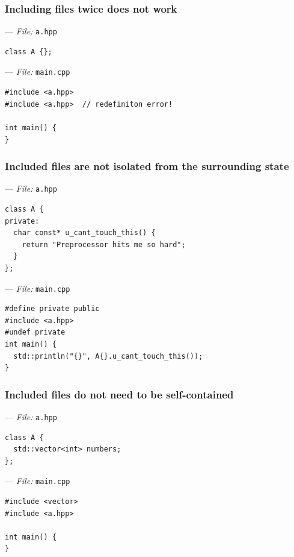 \documentclass[aspectratio=169]{beamer}
\newif\iftransitions
\newcommand{\cpause}{\iftransitions \pause \fi}
\begin{document}
\begin{frame}[fragile]
  \frametitle{Including files twice does not work}

  --- \textit{File:} \texttt{a.hpp}
  \begin{lstlisting}[style=cpp20]
class A {};
  \end{lstlisting}

  --- \textit{File:} \texttt{main.cpp}
  \begin{lstlisting}[style=cpp20]
#include <a.hpp>
#include <a.hpp>  // redefiniton error!

int main() {
}
  \end{lstlisting}

\end{frame}

\begin{frame}[fragile]
  \frametitle{Included files are not isolated from the surrounding state}

  --- \textit{File:} \texttt{a.hpp}
  \begin{lstlisting}[style=cpp20]
class A {
private:
  char const* u_cant_touch_this() {
    return "Preprocessor hits me so hard";
  }
};
  \end{lstlisting}
  \cpause
  --- \textit{File:} \texttt{main.cpp}
  \begin{lstlisting}[style=cpp20]
#define private public
#include <a.hpp>
#undef private
int main() {
  std::println("{}", A{}.u_cant_touch_this());
}
  \end{lstlisting}

\end{frame}

\begin{frame}[fragile]
  \frametitle{Included files do not need to be self-contained}

  --- \textit{File:} \texttt{a.hpp}
  \begin{lstlisting}[style=cpp20]
class A {
  std::vector<int> numbers;
};
  \end{lstlisting}

  --- \textit{File:} \texttt{main.cpp}
  \begin{lstlisting}[style=cpp20]
#include <vector>
#include <a.hpp>

int main() {
}
  \end{lstlisting}

\end{frame}
\end{document}
